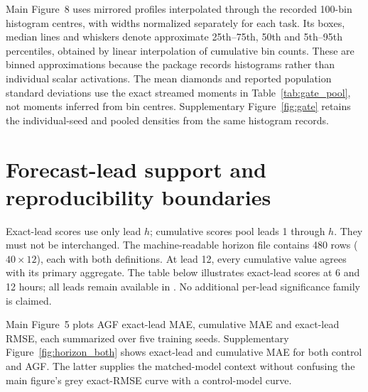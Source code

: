 \documentclass[10pt,a4paper]{article}
\begin{document}
Main Figure~8 uses mirrored profiles interpolated through the recorded 100-bin histogram centres, with widths normalized separately for each task. Its boxes, median lines and whiskers denote approximate 25th--75th, 50th and 5th--95th percentiles, obtained by linear interpolation of cumulative bin counts. These are binned approximations because the package records histograms rather than individual scalar activations. The mean diamonds and reported population standard deviations use the exact streamed moments in Table~\ref{tab:gate_pool}, not moments inferred from bin centres. Supplementary Figure~\ref{fig:gate} retains the individual-seed and pooled densities from the same histogram records.

\section{Forecast-lead support and reproducibility boundaries}
Exact-lead scores use only lead $h$; cumulative scores pool leads 1 through $h$. They must not be interchanged. The machine-readable horizon file contains 480 rows ($40\times12$), each with both definitions. At lead 12, every cumulative value agrees with its primary aggregate. The table below illustrates exact-lead scores at 6 and 12 hours; all leads remain available in . No additional per-lead significance family is claimed.

Main Figure~5 plots AGF exact-lead MAE, cumulative MAE and exact-lead RMSE, each summarized over five training seeds. Supplementary Figure~\ref{fig:horizon_both} shows exact-lead and cumulative MAE for both control and AGF. The latter supplies the matched-model context without confusing the main figure's grey exact-RMSE curve with a control-model curve.
\end{document}
